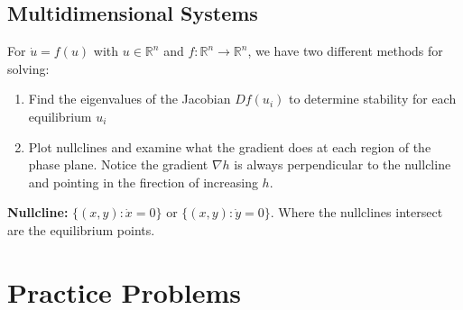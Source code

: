 \documentclass[12pt]{article}
\newcommand{\R}{\mathbb{R}}
\newcommand*{\tbf}[1]{\ifmmode\mathbf{#1}\else\textbf{#1}\fi}
\begin{document}
\begin{multicols}{2}
    \subsection{Multidimensional Systems}
    For $\dot u = f(u)$ with $u \in \R^n$ and $f: \R^n \to \R^n$, we have two different methods for solving:
    \begin{enumerate}
        \item Find the eigenvalues of the Jacobian $Df(u_i)$ to determine stability for each equilibrium $u_i$
        \item Plot nullclines and examine what the gradient does at each region of the phase plane. Notice the gradient $\nabla h$ is always perpendicular to the nullcline and pointing in the firection of increasing $h$.
    \end{enumerate}

    \tbf{Nullcline:} $\{(x, y): \dot x = 0\}$ or $\{(x, y): \dot y = 0\}$. Where the nullclines intersect are the equilibrium points.

\end{multicols}
\pagebreak

\section{Practice Problems}
\end{document}
